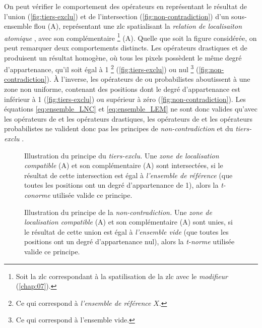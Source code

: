 On peut vérifier le comportement des opérateurs en représentant le
résultat de l'union (\autoref{fig:tiers-exclu}) et de l'intersection
(\autoref{fig:non-contradiction}) d'un sous-ensemble flou
(\textcolor{RdBu-9-1}{\textsf{A}}), représentant une \ac{zlc}
spatialisant la \emph{relation de localisaiton atomique}
, avec son complémentaire \footnote{Soit la
  \ac{zlc} correspondant à la spatilisation de la \ac{zlc}
   avec le \emph{modifieur} 
  (\autoref{chap:07}).}
(\textcolor{RdBu-9-9}{\textsf{A}}). Quelle que soit la figure
considérée, on peut remarquer deux comportements distincts. Les
opérateurs drastiques et de  produisent un résultat
homogène, où tous les pixels possèdent le même degré d'appartenance,
qu'il soit égal à 1 \footnote{Ce qui correspond à \emph{l'ensemble de
    référence} \(X\).} (\autoref{fig:tiers-exclu}) ou nul \footnote{Ce
  qui correspond à l'ensemble vide.}
(\autoref{fig:non-contradiction}). À l'inverse, les opérateurs de
 ou probabilistes aboutissent à une zone non uniforme,
contenant des positions dont le degré d'appartenance est inférieur à 1
(\autoref{fig:tiers-exclu}) ou supérieur à zéro
(\autoref{fig:non-contradiction}). Les équations \ref{eq:ensemble_LNC}
et \ref{eq:ensemble_LEM} ne sont donc valides qu'avec les opérateurs
de  et les opérateurs drastiques, les opérateurs de
 et les opérateurs probabilistes ne valident donc pas les
principes de \emph{non-contradiction} et du \emph{tiers-exclu}
\autocite{Bouchon-Meunier2007}.

\begin{figure}
  \centering
  
  \caption[Illustration du principe du
  \emph{tiers-exclu}]{Illustration du principe du \emph{tiers-exclu.}
    Une \emph{zone de localisation compatible}
    (\textcolor{RdBu-9-1}{\textsf{A}}) et son complémentaire
    (\textcolor{RdBu-9-9}{\textsf{A}}) sont intersectées, si le
    résultat de cette intersection est égal à \emph{l'ensemble de
      référence} (\ie que toutes les positions ont un degré
    d'appartenance de 1), alors la \emph{t-conorme} utilisée valide ce
    principe.}
  \label{fig:tiers-exclu}
\end{figure}

\begin{figure}
  \centering
  
  \caption[Illustration du principe de la
  \emph{non-contradiction}]{Illustration du principe de la
    \emph{non-contradiction.} Une \emph{zone de localisation
      compatible} (\textcolor{RdBu-9-1}{\textsf{A}}) et son
    complémentaire (\textcolor{RdBu-9-9}{\textsf{A}}) sont
    unies, si le résultat de cette union est égal à \emph{l'ensemble
      vide} (\ie que toutes les positions ont un degré d'appartenance
    nul), alors la \emph{t-norme} utilisée valide ce principe.}
  \label{fig:non-contradiction}
\end{figure}

